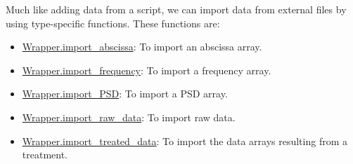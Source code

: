Much like adding data from a script, we can import data from external files by using type-specific functions. These functions are:
\begin{itemize}
    \item \hyperref[subchapter:wrapper.import_abscissa]{Wrapper.import\_abscissa}: To import an abscissa array.
    \item \hyperref[subchapter:wrapper.import_frequency]{Wrapper.import\_frequency}: To import a frequency array.
    \item \hyperref[subchapter:wrapper.import_psd]{Wrapper.import\_PSD}: To import a PSD array.
    \item \hyperref[subchapter:wrapper.import_raw_data]{Wrapper.import\_raw\_data}: To import raw data.
    \item \hyperref[subchapter:wrapper.import_treated_data]{Wrapper.import\_treated\_data}: To import the data arrays resulting from a treatment.
\end{itemize}


